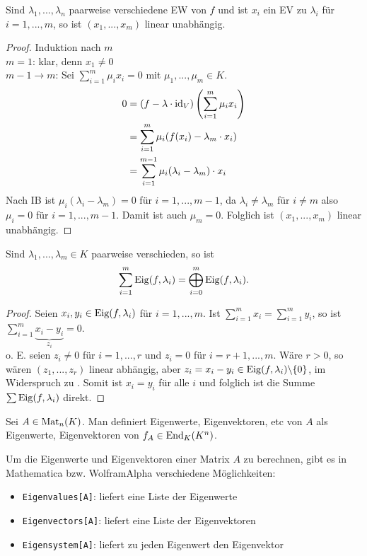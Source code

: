 \begin{lemma}
	Sind $\lambda_1,...,\lambda_n$ paarweise verschiedene EW von $f$ und ist $x_i$ ein EV zu $\lambda_i$ für $i=1,...,m$, so ist $(x_1,...,x_m)$ linear unabhängig.
\end{lemma}
\begin{proof}
	Induktion nach $m$\\
	\emph{$m=1$}: klar, denn $x_1\neq 0$ \\
	\emph{$m-1\to m$}: Sei $\sum_{i=1}^m \mu_i x_i=0$ mit $\mu_1,...,\mu_m\in K$.
	\begin{align}
		0&= (f-\lambda\cdot\operatorname{id}_V)\left( \sum\limits_{i=1}^m \mu_i x_i\right) \notag \\
		&= \sum\limits_{i=1}^m \mu_i(f(x_i)-\lambda_m\cdot x_i) \notag \\
		&= \sum\limits_{i=1}^{m-1} \mu_i(\lambda_i-\lambda_m)\cdot x_i \notag
	\end{align} 
	Nach IB ist $\mu_i(\lambda_i-\lambda_m)=0$ für $i=1,...,m-1$, da $\lambda_i\neq\lambda_m$ für $i\neq m$ also $\mu_i=0$ für $i=1,...,m-1$. Damit ist auch $\mu_m=0$. Folglich ist $(x_1,...,x_m)$ linear unabhängig.
\end{proof}

\begin{proposition}
	Sind $\lambda_1,...,\lambda_m\in K$ paarweise verschieden, so ist 
	\[\sum\limits_{i=1}^m \operatorname{Eig}(f,\lambda_i)=\bigoplus_{i=0}^{m}\operatorname{Eig}(f,\lambda_i).\]
\end{proposition}
\begin{proof}
	Seien $x_i,y_i\in\operatorname{Eig}(f,\lambda_i)$ für $i=1,...,m$. Ist $\sum_{i=1}^m x_i=\sum_{i=1}^m y_i$, so ist $\sum_{i=1}^m \underbrace{x_i-y_i}_{z_i}=0$.\\
	o. E. seien $z_i\neq 0$ für $i=1,...,r$ und $z_i=0$ für $i=r+1,...,m$. Wäre $r>0$, so wären $(z_1,...,z_r)$ linear abhängig, aber $z_i=x_i-y_i\in\operatorname{Eig}(f,\lambda_i)\backslash\{0\}$, im Widerspruch zu . Somit ist $x_i=y_i$ für alle $i$ und folglich ist die Summe $\sum\operatorname{Eig}(f,\lambda_i)$ direkt.
\end{proof}

\begin{definition}
	Sei $A\in\operatorname{Mat}_n(K)$. Man definiert Eigenwerte, Eigenvektoren, etc von $A$ als Eigenwerte, Eigenvektoren von $f_A\in\operatorname{End}_K(K^n)$.
\end{definition}

\begin{mathematica}
	Um die Eigenwerte und Eigenvektoren einer Matrix $A$ zu berechnen, gibt es in Mathematica bzw. WolframAlpha verschiedene Möglichkeiten:
	\begin{itemize}
		\item \texttt{Eigenvalues[A]}: liefert eine Liste der Eigenwerte
		\item \texttt{Eigenvectors[A]}: liefert eine Liste der Eigenvektoren
		\item \texttt{Eigensystem[A]}: liefert zu jeden Eigenwert den Eigenvektor
	\end{itemize}
\end{mathematica}

